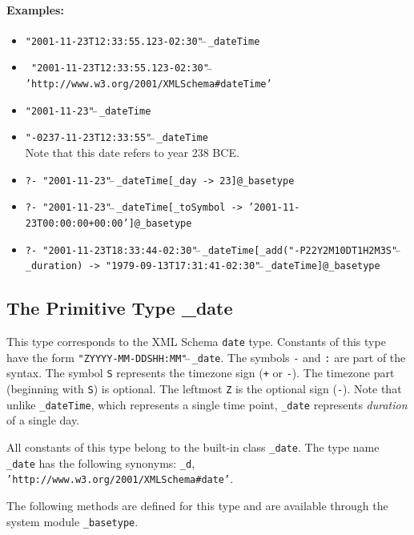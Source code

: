 \documentclass[11pt]{article}
\begin{document}
\paragraph{Examples:}
\begin{itemize}
      \item {\tt "2001-11-23T12:33:55.123-02:30"$\hat{~}\hat{~}$\_dateTime} 
      \item
        {\tt
          "2001-11-23T12:33:55.123-02:30"$\hat{~}\hat{~}$'http://www.w3.org/2001/XMLSchema\#dateTime'} 
      \item {\tt "2001-11-23"$\hat{~}\hat{~}$\_dateTime}  
      \item {\tt "-0237-11-23T12:33:55"$\hat{~}\hat{~}$\_dateTime}\\ 
        Note that this date refers to year 238 BCE.
      \item {\tt ?- "2001-11-23"$\hat{~}\hat{~}$\_dateTime[\_day -> 23]@\_basetype}  
      \item {\tt ?- "2001-11-23"$\hat{~}\hat{~}$\_dateTime[\_toSymbol ->
        '2001-11-23T00:00:00+00:00']@\_basetype}  
      \item {\tt ?- "2001-11-23T18:33:44-02:30"$\hat{~}\hat{~}$\_dateTime[\_add("-P22Y2M10DT1H2M3S"$\hat{~}\hat{~}$\_duration)
      -> "1979-09-13T17:31:41-02:30"$\hat{~}\hat{~}$\_dateTime]@\_basetype}  
      \end{itemize}

\subsection{ The Primitive Type \_date}

This type corresponds to the XML Schema {\tt date} type.  Constants of this
type have the form {\tt "ZYYYY-MM-DDSHH:MM"$\hat{~}\hat{~}$\_date}.  The
symbols {\tt -} and {\tt :} are part of the syntax. The symbol {\tt S}
represents the timezone sign ({\tt +} or {\tt -}). The timezone part
(beginning with {\tt S}) is optional. The leftmost {\tt Z} is the optional
sign ({\tt -}). Note that unlike {\tt \_dateTime}, which represents a
single time point, {\tt \_date}  represents \emph{duration} of a single day.


All constants of this type belong to the built-in class {\tt \_date}. 
The type name {\tt \_date} has the following synonyms: 
{\tt \_d},  {\tt 'http://www.w3.org/2001/XMLSchema\#date'}. 

The following methods are defined for this type and are available through
the system module {\tt \_basetype}.
\end{document}
